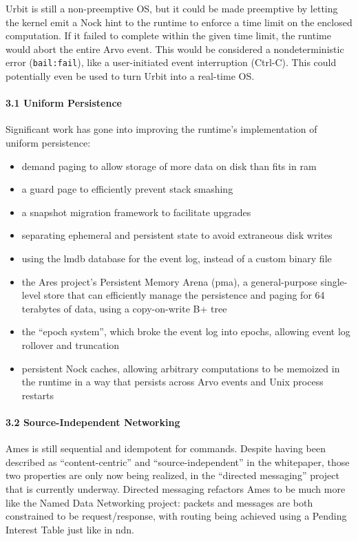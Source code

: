 \documentclass[twoside]{article}
\begin{document}
Urbit is still a non-preemptive OS, but it could be made preemptive by letting the kernel emit a Nock hint to the runtime to enforce a time limit on the enclosed computation.  If it failed to complete within the given time limit, the runtime would abort the entire Arvo event.  This would be considered a nondeterministic error (\lstinline[style=inlinecode]{bail:fail}), like a user-initiated event interruption (Ctrl-C).  This could potentially even be used to turn Urbit into a real-time OS.

\paragraph{3.1 Uniform Persistence}

Significant work has gone into improving the runtime's implementation of uniform persistence:
\begin{itemize}
  \item  demand paging to allow storage of more data on disk than fits in {\sc ram}
  \item  a guard page to efficiently prevent stack smashing
  \item  a snapshot migration framework to facilitate upgrades
  \item  separating ephemeral and persistent state to avoid extraneous disk writes
  \item  using the {\sc lmdb} database for the event log, instead of a custom binary file
  \item  the Ares project's Persistent Memory Arena ({\sc pma}), a general-purpose single-level store that can efficiently manage the persistence and paging for 64 terabytes of data, using a copy-on-write B+ tree
  \item  the ``epoch system'', which broke the event log into epochs, allowing event log rollover and truncation
  \item  persistent Nock caches, allowing arbitrary computations to be memoized in the runtime in a way that persists across Arvo events and Unix process restarts
\end{itemize}

\paragraph{3.2 Source-Independent Networking}

Ames is still sequential and idempotent for commands.  Despite having been described as ``content-centric'' and ``source-independent'' in the whitepaper, those two properties are only now being realized, in the ``directed messaging'' project that is currently underway.  Directed messaging refactors Ames to be much more like the Named Data Networking project: packets and messages are both constrained to be request/response, with routing being achieved using a Pending Interest Table just like in {\sc ndn}.
\end{document}

